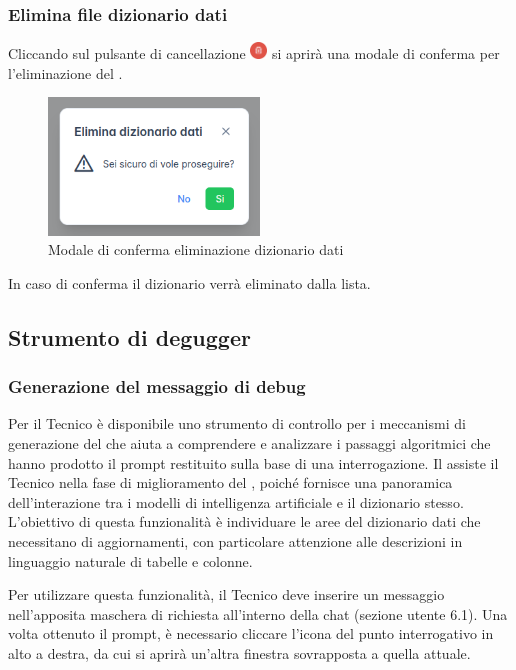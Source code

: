 \subsubsection{Elimina file dizionario dati}
Cliccando sul pulsante di cancellazione \includegraphics[height=1.2em]{assets/dd_delete_button.png} si aprirà una modale di conferma per l'eliminazione del .
\begin{figure}[H]
  \centering
  \includegraphics[width=0.5\textwidth]{assets/dd_confirm_delete.png}
  \caption{Modale di conferma eliminazione dizionario dati}
\end{figure}
In caso di conferma il dizionario verrà eliminato dalla lista.



\subsection{Strumento di degugger}

\subsubsection{Generazione del messaggio di debug}
\par Per il Tecnico è disponibile uno strumento di controllo per i meccanismi di generazione del  che aiuta a comprendere e analizzare i passaggi algoritmici che hanno prodotto il prompt restituito sulla base di una interrogazione. Il  assiste il Tecnico nella fase di miglioramento del , poiché fornisce una panoramica dell'interazione tra i modelli di intelligenza artificiale e il dizionario stesso. L'obiettivo di questa funzionalità è individuare le aree del dizionario dati che necessitano di aggiornamenti, con particolare attenzione alle descrizioni in linguaggio naturale di tabelle e colonne.

\par Per utilizzare questa funzionalità, il Tecnico deve inserire un messaggio nell'apposita maschera di richiesta all'interno della chat (sezione utente 6.1). Una volta ottenuto il prompt, è necessario cliccare l'icona del punto interrogativo in alto a destra, da cui si aprirà un'altra finestra sovrapposta a quella attuale.

